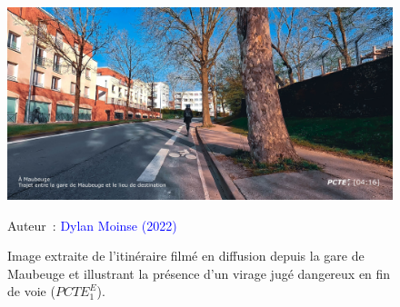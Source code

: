 \begin{refsegment}
    \begin{figure}[h!]\vspace*{4pt}
        \caption{Image extraite de l'itinéraire filmé en diffusion depuis la gare de Maubeuge et illustrant la présence d'un virage jugé dangereux en fin de voie (\(PCTE^{E}_{1}\)).}
        \label{fig-chap4:pcte1e-partage-voirie}
        \centerline{\includegraphics[width=1\columnwidth]{src/Figures/Chap-4/Extrait_Video_PCTE1_Egress_9.jpg}}
        \vspace{5pt}
        \begin{flushright}\scriptsize{
        Auteur~: \textcolor{blue}{Dylan Moinse (2022)}
        }\end{flushright}
    \end{figure}


\end{refsegment}
